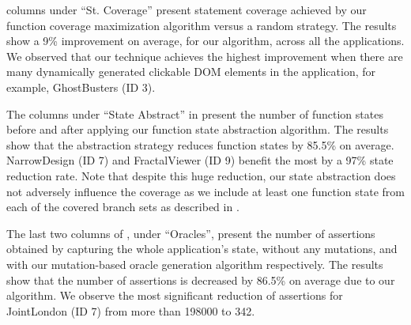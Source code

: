  columns under ``St. Coverage'' present \javascript statement coverage achieved by  our function coverage maximization algorithm versus a random strategy. The results show a 9\% improvement on average, for our algorithm, across all the applications. We observed that our technique achieves the highest improvement when there are many dynamically generated clickable DOM elements in the application, for example, GhostBusters (ID 3). 

The columns under ``State Abstract'' in  present the number of function states
before and after applying our function state abstraction algorithm.   
The results show that the abstraction strategy reduces function states by 85.5\% on average. NarrowDesign (ID 7) and FractalViewer (ID 9) benefit the most by a 97\% state reduction rate. 
Note that despite this huge reduction, our state abstraction does not adversely influence the coverage as we include at least one function state from each of the covered branch sets as described in .

The last two columns of , under ``Oracles'', present the number of assertions obtained by capturing the whole application's state,  without any mutations, and with our mutation-based oracle generation algorithm respectively. The results show that the number of assertions is decreased by 86.5\% on average due to 
our algorithm. 
We observe the most significant reduction of assertions for JointLondon (ID 7) from more than 198000 to 342. 





